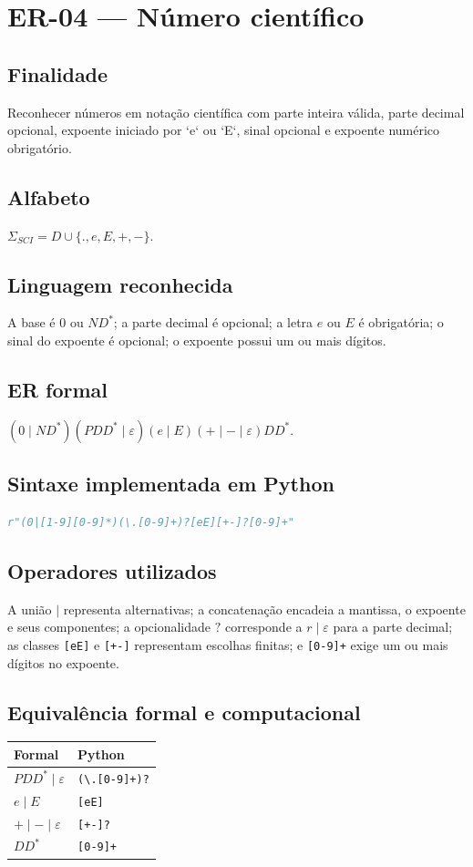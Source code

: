 \section{ER-04 --- Número científico}
\subsection{Finalidade}
Reconhecer números em notação científica com parte inteira válida, parte decimal opcional, expoente iniciado por `e` ou `E`, sinal opcional e expoente numérico obrigatório.
\subsection{Alfabeto}
$\Sigma_{SCI}=D\cup\{.,e,E,+,-\}$.
\subsection{Linguagem reconhecida}
A base é $0$ ou $ND^*$; a parte decimal é opcional; a letra $e$ ou $E$ é obrigatória; o sinal do expoente é opcional; o expoente possui um ou mais dígitos.
\subsection{ER formal}
$(0\mid ND^*)(PDD^*\mid\varepsilon)(e\mid E)(+\mid-\mid\varepsilon)DD^*$.
\subsection{Sintaxe implementada em Python}
\begin{lstlisting}[language=Python]
r"(0|[1-9][0-9]*)(\.[0-9]+)?[eE][+-]?[0-9]+"
\end{lstlisting}
\subsection{Operadores utilizados}
A união $\mid$ representa alternativas; a concatenação encadeia a mantissa, o expoente e seus componentes; a opcionalidade $?$ corresponde a $r\mid\varepsilon$ para a parte decimal; as classes \texttt{[eE]} e \texttt{[+-]} representam escolhas finitas; e \texttt{[0-9]+} exige um ou mais dígitos no expoente.
\subsection{Equivalência formal e computacional}
\begin{center}
\small
\begin{tabular}{|p{}|p{}|}
\toprule
Formal & Python \\
\midrule
$PDD^*\mid\varepsilon$ & \texttt{(\textbackslash.[0-9]+)?} \\
$e\mid E$ & \texttt{[eE]} \\
$+\mid-\mid\varepsilon$ & \texttt{[+-]?} \\
$DD^*$ & \texttt{[0-9]+} \\
\bottomrule
\end{tabular}
\end{center}
